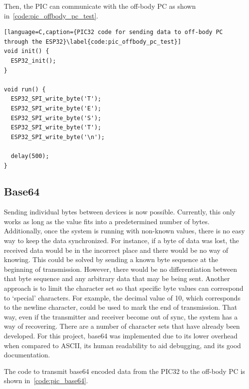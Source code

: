 Then, the PIC can communicate with the off-body PC as shown in~\autoref{code:pic_offbody_pc_test}.

\begin{lstlisting}[language=C,caption={PIC32 code for sending data to off-body PC through the ESP32}\label{code:pic_offbody_pc_test}]
void init() {
  ESP32_init();
}

void run() {
  ESP32_SPI_write_byte('T');
  ESP32_SPI_write_byte('E');
  ESP32_SPI_write_byte('S');
  ESP32_SPI_write_byte('T');
  ESP32_SPI_write_byte('\n');

  delay(500);
}
\end{lstlisting}

\subsection{Base64}
Sending individual bytes between devices is now possible.
Currently, this only works as long as the value fits into a predetermined number of bytes.
Additionally, once the system is running with non-known values, there is no easy way to keep the data synchronized.
For instance, if a byte of data was lost, the received data would be in the incorrect place
and there would be no way of knowing.
This could be solved by sending a known byte sequence at the beginning of transmission.
However, there would be no differentiation between that byte sequence and any arbitrary data that may be being sent.
Another approach is to limit the character set so that specific byte values can correspond to `special' characters.
For example, the decimal value of 10, which corresponds to the newline character, could be used to mark the end of transmission.
That way, even if the transmitter and receiver become out of sync, the system has a way of recovering.
There are a number of character sets that have already been developed.
For this project, base64 was implemented due to its lower overhead when compared to ASCII, its human readability to aid debugging, and its good documentation.

The code to transmit base64 encoded data from the PIC32 to the off-body PC is shown in~\autoref{code:pic_base64}.

